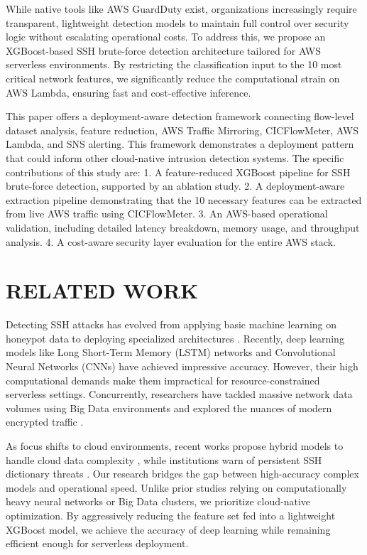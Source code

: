 \documentclass[conference]{IEEEtran}
\begin{document}
While native tools like AWS GuardDuty exist, organizations increasingly require transparent, lightweight detection models to maintain full control over security logic without escalating operational costs. To address this, we propose an XGBoost-based SSH brute-force detection architecture tailored for AWS serverless environments. By restricting the classification input to the 10 most critical network features, we significantly reduce the computational strain on AWS Lambda, ensuring fast and cost-effective inference.

This paper offers a deployment-aware detection framework connecting flow-level dataset analysis, feature reduction, AWS Traffic Mirroring, CICFlowMeter, AWS Lambda, and SNS alerting. This framework demonstrates a deployment pattern that could inform other cloud-native intrusion detection systems. The specific contributions of this study are:
1. A feature-reduced XGBoost pipeline for SSH brute-force detection, supported by an ablation study.
2. A deployment-aware extraction pipeline demonstrating that the 10 necessary features can be extracted from live AWS traffic using CICFlowMeter.
3. An AWS-based operational validation, including detailed latency breakdown, memory usage, and throughput analysis.
4. A cost-aware security layer evaluation for the entire AWS stack.

\section{RELATED WORK}

Detecting SSH attacks has evolved from applying basic machine learning on honeypot data \cite{b1, b2} to deploying specialized architectures \cite{b3, b7, b13}. Recently, deep learning models like Long Short-Term Memory (LSTM) networks \cite{b4} and Convolutional Neural Networks (CNNs) \cite{b6} have achieved impressive accuracy. However, their high computational demands make them impractical for resource-constrained serverless settings. Concurrently, researchers have tackled massive network data volumes using Big Data environments \cite{b5, b8} and explored the nuances of modern encrypted traffic \cite{b9, b10}.

As focus shifts to cloud environments, recent works propose hybrid models to handle cloud data complexity \cite{b12}, while institutions warn of persistent SSH dictionary threats \cite{b11}. Our research bridges the gap between high-accuracy complex models and operational speed. Unlike prior studies relying on computationally heavy neural networks or Big Data clusters, we prioritize cloud-native optimization. By aggressively reducing the feature set fed into a lightweight XGBoost model, we achieve the accuracy of deep learning while remaining efficient enough for serverless deployment.
\end{document}
